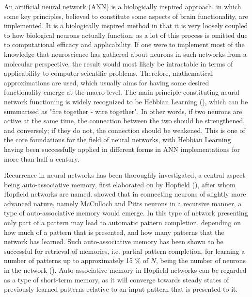 An artificial neural network (ANN) is a biologically inspired approach, in which some key principles, believed to constitute some aspects of brain functionality, are implemented. It is a biologically inspired method in that it is very loosely coupled to how biological neurons actually function, as a lot of this process is omitted due to computational efficacy and applicability. If one were to implement most of the knowledge that neuroscience has gathered about neurons in such networks from a molecular perspective, the result would most likely be intractable in terms of applicability to computer scientific problems. Therefore, mathematical approximations are used, which usually aims for having some desired functionality emerge at the macro-level. The main principle constituting neural network functioning is widely recognized to be Hebbian Learning (\cite{Hebb1949}), which can be summarised as "fire together - wire together". In other words, if two neurons are active at the same time, the connection between the two should be strengthened, and conversely; if they do not, the connection should be weakened. This is one of the core foundations for the field of neural networks, with Hebbian Learning having been successfully applied in different forms in ANN implementations for more than half a century.


Recurrence in neural networks has been thoroughly investigated, a central aspect being auto-associative memory, first elaborated on by Hopfield (\cite{Hopfield1982}), after whom Hopfield networks are named. \cite{Hopfield1982} showed that in connecting neurons of slightly more advanced nature, namely McCulloch and Pitts neurons in a recursive manner, a type of auto-associative memory would emerge. In this type of network presenting only part of a pattern may lead to automatic pattern completion, depending on how much of a pattern that is presented, and how many patterns that the network has learned. Such auto-associative memory has been shown to be successful for retrieval of memories, i.e. partial pattern completion, for learning a number of patterns up to approximately 15 \% of $N$, being the number of neurons in the network (\cite{Hopfield1982}). Auto-associative memory in Hopfield networks can be regarded as a type of short-term memory, as it will converge towards steady states of previously learned patterns relative to an input pattern that is presented to it.

